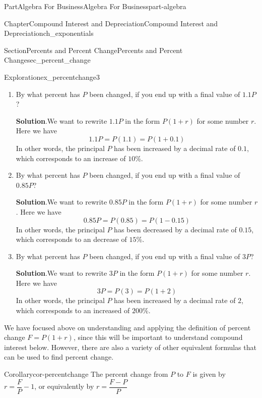 \documentclass{tufte-book}
\newcommand{\blocktitlefont}{\relax}
\numberwithin{equation}{chapter}
\begin{document}
\begin{partptx}{Part}{Algebra For Business}{}{Algebra For Business}{}{}{part-algebra}
\begin{chapterptx}{Chapter}{Compound Interest and Depreciation}{}{Compound Interest and Depreciation}{}{}{ch_exponentials}
\begin{sectionptx}{Section}{Percents and Percent Change}{}{Percents and Percent Change}{}{}{sec_percent_change}
\begin{exploration}{Exploration}{}{ex_percentchange3}
\begin{enumerate}[font=\bfseries,label=(\alph*),ref=\alph*]%
\item{}By what percent has \(P\) been changed, if you end up with a final value of \(1.1 P\)?%
\par\smallskip%
\noindent\textbf{\blocktitlefont Solution}.\hypertarget{ex_percentchange3-2-2}{}\quad{}We want to rewrite \(1.1 P\) in the form \(P(1+r)\) for some number \(r\). Here we have%
\begin{equation*}
1.1P = P(1.1) = P(1 + 0.1)
\end{equation*}
In other words, the principal \(P\) has been increased by a decimal rate of \(0.1\), which corresponds to an increase of \(10 \)\%.%
\item{}By what percent has \(P\) been changed, if you end up with a final value of \(0.85 P\)?%
\par\smallskip%
\noindent\textbf{\blocktitlefont Solution}.\hypertarget{ex_percentchange3-3-2}{}\quad{}We want to rewrite \(0.85 P\) in the form \(P(1+r)\) for some number \(r\). Here we have%
\begin{equation*}
0.85P = P(0.85) = P(1 - 0.15)
\end{equation*}
In other words, the principal \(P\) has been decreased by a decimal rate of \(0.15\), which corresponds to an decrease of \(15 \)\%.%
\item{}By what percent has \(P\) been changed, if you end up with a final value of \(3 P\)?%
\par\smallskip%
\noindent\textbf{\blocktitlefont Solution}.\hypertarget{ex_percentchange3-4-2}{}\quad{}We want to rewrite \(3 P\) in the form \(P(1+r)\) for some number \(r\). Here we have%
\begin{equation*}
3P = P(3) = P(1 +2)
\end{equation*}
In other words, the principal \(P\) has been increased by a decimal rate of \(2\), which corresponds to an increased of \(200 \)\%.%
\end{enumerate}%
\end{exploration}%
We have focused above on understanding and applying the definition of percent change \(F = P(1+r)\), since this will be important to understand compound interest below. However, there are also a variety of other equivalent formulas that can be used to find percent change.%
\begin{corollary}{Corollary}{}{}{cor-percentchange}%
The percent change from \(P\) to \(F\) is given by \(r = \dfrac{F}{P}-1\), or equivalently by \(r = \dfrac{F-P}{P}\)%

\end{corollary}
\end{sectionptx}
\end{chapterptx}
\end{partptx}
\end{document}
